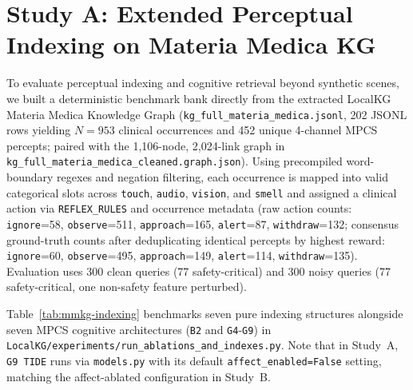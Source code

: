 \documentclass[12pt,a4paper,oneside]{report}
\newcommand{\code}[1]{\texttt{\small #1}}
\begin{document}
\section{Study A: Extended Perceptual Indexing on Materia Medica KG}\label{sec:study-a}
To evaluate perceptual indexing and cognitive retrieval beyond synthetic scenes, we built a deterministic benchmark bank directly from the extracted LocalKG Materia Medica Knowledge Graph (\code{kg\_full\_materia\_medica.jsonl}, 202 JSONL rows yielding $N=953$ clinical occurrences and 452 unique 4-channel MPCS percepts; paired with the 1{,}106-node, 2{,}024-link graph in \code{kg\_full\_materia\_medica\_cleaned.graph.json}). Using precompiled word-boundary regexes and negation filtering, each occurrence is mapped into valid categorical slots across \code{touch}, \code{audio}, \code{vision}, and \code{smell} and assigned a clinical action via \code{REFLEX\_RULES} and occurrence metadata (raw action counts: \code{ignore}=58, \code{observe}=511, \code{approach}=165, \code{alert}=87, \code{withdraw}=132; consensus ground-truth counts after deduplicating identical percepts by highest reward: \code{ignore}=60, \code{observe}=495, \code{approach}=149, \code{alert}=114, \code{withdraw}=135). Evaluation uses 300 clean queries (77 safety-critical) and 300 noisy queries (77 safety-critical, one non-safety feature perturbed).

Table~\ref{tab:mmkg-indexing} benchmarks seven pure indexing structures alongside seven MPCS cognitive architectures (\code{B2} and \code{G4}-\code{G9}) in \code{LocalKG/experiments/run\_ablations\_and\_indexes.py}. Note that in Study~A, \code{G9 TIDE} runs via \code{models.py} with its default \code{affect\_enabled=False} setting, matching the affect-ablated configuration in Study~B.
\end{document}
